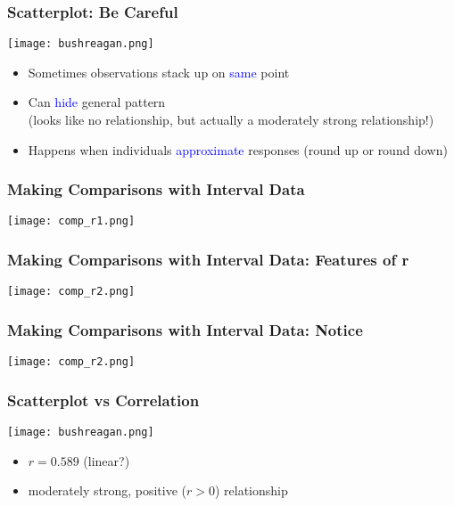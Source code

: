 \documentclass{beamer}
\newcommand{\blue}{\textcolor{blue}}
\begin{document}
\begin{frame}
 \frametitle<+->{Scatterplot: Be Careful}
 \begin{minipage}{.48\linewidth}
 \texttt{[image: bushreagan.png]}
 \end{minipage}\hfill
 \begin{minipage}{.48\linewidth}
 \begin{itemize}
   \item Sometimes observations stack up on \blue{same} point
   \item Can \blue{hide} general pattern\\
   (looks like no relationship, but actually a moderately strong relationship!)
   \item Happens when individuals \blue{approximate} responses (round up or round down)
 \end{itemize}
 \end{minipage}
\end{frame}

\begin{frame}
 \frametitle{Making Comparisons with Interval Data}
 \begin{center}
 \texttt{[image: comp\_r1.png]}
 \end{center}
\end{frame}

\begin{frame}
 \frametitle{Making Comparisons with Interval Data: Features of r}
 \begin{center}
 \texttt{[image: comp\_r2.png]}
 \end{center}
\end{frame}

\begin{frame}
 \frametitle{Making Comparisons with Interval Data: Notice}
 \begin{center}
 \texttt{[image: comp\_r2.png]}
 \end{center}
\end{frame}

\begin{frame}
 \frametitle<+->{Scatterplot vs Correlation}
 \begin{minipage}{.58\linewidth}
 \texttt{[image: bushreagan.png]}
 \end{minipage}\hfill
 \begin{minipage}{.38\linewidth}
 \begin{itemize}
   \item $r = 0.589$ (linear?)
   \item moderately strong, positive ($r > 0$) relationship 
 \end{itemize}
 \end{minipage}
\end{frame}
\end{document}
